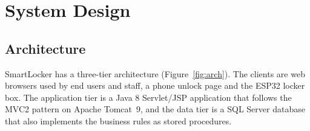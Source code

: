 \section{System Design}\label{sec:design}

\subsection{Architecture}

SmartLocker has a three-tier architecture (Figure~\ref{fig:arch}). The clients are web browsers used by end users and
staff, a phone unlock page and the ESP32 locker box. The application tier is a Java 8 Servlet/JSP application that
follows the MVC2 pattern on Apache Tomcat~9, and the data tier is a SQL Server database that also implements the
business rules as stored procedures.


